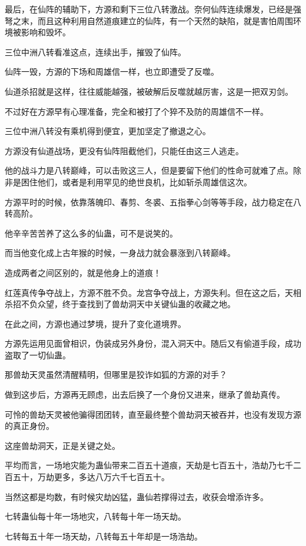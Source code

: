 \begin{this_body}
最后，在仙阵的辅助下，方源和剩下三位八转激战。奈何仙阵连续爆发，已经是强弩之末，而且这种利用自然道痕建立的仙阵，有一个天然的缺陷，就是害怕周围环境被影响和毁坏。

三位中洲八转看准这点，连续出手，摧毁了仙阵。

仙阵一毁，方源的下场和周雄信一样，也立即遭受了反噬。

仙道杀招就是这样，往往威能越强，被破解后反噬就越厉害，这是一把双刃剑。

不过好在方源早有心理准备，完全和被打了个猝不及防的周雄信不一样。

三位中洲八转没有乘机得到便宜，更加坚定了撤退之心。

方源没有仙道战场，更没有仙阵阻截他们，只能任由这三人逃走。

他的战斗力是八转巅峰，可以击败这三人，但是要留下他们的性命可就难了点。除非是困住他们，或者是利用罕见的绝世良机，比如斩杀周雄信这次。

方源平时的时候，依靠落魄印、春剪、冬裘、五指拳心剑等等手段，战力稳定在八转高阶。

他辛辛苦苦养了这么多的仙蛊，可不是说笑的。

而当他变化成上古年猴的时候，一身战力就会暴涨到八转巅峰。

造成两者之间区别的，就是他身上的道痕！

红莲真传争夺战上，方源不胜不负。龙宫争夺战上，方源失利。但在这之后，天相杀招不负众望，终于查找到了兽劫洞天中关键仙蛊的收藏之地。

在此之间，方源也通过梦境，提升了变化道境界。

方源先运用见面曾相识，伪装成另外身份，混入洞天中。随后又有偷道手段，成功盗取了一切仙蛊。

那兽劫天灵虽然清醒精明，但哪里是狡诈如狐的方源的对手？

做到这步后，方源再无顾虑，出去后换了一个身份又进来，继承了兽劫真传。

可怜的兽劫天灵被他骗得团团转，直至最终整个兽劫洞天被吞并，也没有发现方源的真正身份。

这座兽劫洞天，正是关键之处。

平均而言，一场地灾能为蛊仙带来二百五十道痕，天劫是七百五十，浩劫乃七千二百五十，万劫更多，多达八万六千七百五十。

当然这都是均数，有时候灾劫凶猛，蛊仙若撑得过去，收获会增添许多。

七转蛊仙每十年一场地灾，八转每十年一场天劫。

七转每五十年一场天劫，八转每五十年却是一场浩劫。


\end{this_body}
